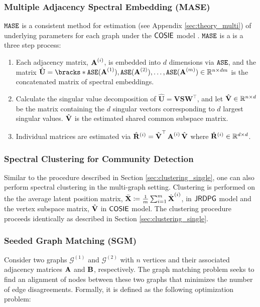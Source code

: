\subsubsection{Multiple Adjacency Spectral Embedding (MASE)}\label{sec:mase}
$\operatorname{\mathtt{MASE}}$ is a consistent method for estimation (see Appendix \ref{sec:theory_multi}) of underlying parameters for each graph under the $\operatorname{\mathsf{COSIE}}$ model \cite{arroyo2019inference}. $\operatorname{\mathtt{MASE}}$ is a is a three step process:
\begin{enumerate}
    \item Each adjacency matrix, $\operatorname{\mathbf{A}}^{(i)}$, is embedded into $d$ dimensions via $\operatorname{\mathtt{ASE}}$, and the matrix $\hat{\mathbf{U}} = \bracks*{\ase(\A^{(1)}), \ase(\A^{(2)}), \ldots, \ase(\A^{(m)})} \in \RR^{n\times dm}$ is the concatenated matrix of spectral embeddings.
    \item Calculate the singular value decomposition of $\hat{\mathbf{U}}=\mathbf{V}\mathbf{S}\mathbf{W}^\top$, and let  $\hat{\operatorname{\mathbf{V}}} \in \mathbb{R}^{n\times d}$ be the matrix containing  the $d$ singular vectors corresponding to $d$ largest singular values. $\hat{\operatorname{\mathbf{V}}}$ is the estimated shared common subspace matrix.
    \item  Individual matrices are estimated via $\hat{\mathbf{R}}^{(i)} = \hat{\operatorname{\mathbf{V}}}^\top\operatorname{\mathbf{A}}^{(i)} \hat{\operatorname{\mathbf{V}}}$ where $\hat{\mathbf{R}}^{(i)}\in \mathbb{R}^{d \times d}$.
\end{enumerate}

\subsubsection{Spectral Clustering for Community Detection} \label{sec:clustering_multi}
Similar to the procedure described in Section \ref{sec:clustering_single}, one can also perform spectral clustering in the multi-graph setting. Clustering is performed on the the average latent position matrix, $\bar{\operatorname{\mathbf{X}}} \coloneqq \frac{1}{m}\sum_{i=1}^m \hat{\operatorname{\mathbf{X}}}^{(i)}$, in $\operatorname{\mathsf{JRDPG}}$ model and the vertex subspace matrix, $\hat{\operatorname{\mathbf{V}}}$ in $\operatorname{\mathsf{COSIE}}$ model. The clustering procedure proceeds identically as described in Section \ref{sec:clustering_single}. 

\subsubsection{Seeded Graph Matching (SGM)} \label{sec:sgm}
Consider two graphs $\mathcal{G}^{(1)}$ and  $\mathcal{G}^{(2)}$ with $n$ vertices and their associated adjacency matrices $\operatorname{\mathbf{A}}$ and $\operatorname{\mathbf{B}}$, respectively. The graph matching problem seeks to find an alignment of nodes between these two graphs that minimizes the number of edge disagreements. Formally, it is defined as the following optimization problem:

